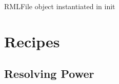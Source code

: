 \documentclass[letterpaper,10pt,english]{sphinxmanual}
\begin{document}
\begin{fulllineitems}
\begin{fulllineitems}
\end{fulllineitems}


\begin{fulllineitems}
\label{\detokenize{code_documentation:raypyng.simulate.SimulationParams.rml}}
\pysigstartsignatures
{}
\pysigstopsignatures
\sphinxAtStartPar
RMLFile object instantiated in init

\end{fulllineitems}


\end{fulllineitems}



\section{Recipes}
\label{\detokenize{code_documentation:recipes}}

\subsection{Resolving Power}
\label{\detokenize{code_documentation:resolving-power}}
\end{document}
